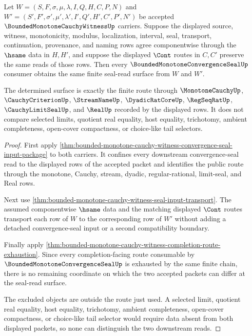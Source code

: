 \begin{theorem}
\label{thm:bounded-monotone-cauchy-witness-finite-seal-route-determinacy}
Let $W=(S,F,\sigma,\mu,\lambda,I,Q,H,C,P,N)$ and $W'=(S',F',\sigma',\mu',\lambda',I',Q',H',C',P',N')$ be accepted $\BoundedMonotoneCauchyWitnessUp$ carriers. Suppose the displayed source, witness, monotonicity, modulus, localization, interval, seal, transport, continuation, provenance, and naming rows agree componentwise through the $\hsame$ data in $H,H'$, and suppose the displayed $\Cont$ routes in $C,C'$ preserve the same reads of those rows. Then every $\BoundedMonotoneConvergenceSealUp$ consumer obtains the same finite seal-read surface from $W$ and $W'$.

The determined surface is exactly the finite route through $\MonotoneCauchyUp$, $\CauchyCriterionUp$, $\StreamNameUp$, $\DyadicRatCoreUp$, $\RegSeqRatUp$, $\CauchyLimitSealUp$, and $\RealUp$ recorded by the displayed rows. It does not compare selected limits, quotient real equality, host equality, trichotomy, ambient completeness, open-cover compactness, or choice-like tail selectors.
\end{theorem}
\begin{proof}
First apply \autoref{thm:bounded-monotone-cauchy-witness-convergence-seal-input-package} to both carriers. It confines every downstream convergence-seal read to the displayed rows of the accepted packet and identifies the public route through the monotone, Cauchy, stream, dyadic, regular-rational, limit-seal, and Real rows.

Next use \autoref{thm:bounded-monotone-cauchy-witness-seal-input-transport}. The assumed componentwise $\hsame$ data and the matching displayed $\Cont$ routes transport each row of $W$ to the corresponding row of $W'$ without adding a detached convergence-seal input or a second compatibility boundary.

Finally apply \autoref{thm:bounded-monotone-cauchy-witness-completion-route-exhaustion}. Since every completion-facing route consumable by $\BoundedMonotoneConvergenceSealUp$ is exhausted by the same finite chain, there is no remaining coordinate on which the two accepted packets can differ at the seal-read surface.

The excluded objects are outside the route just used. A selected limit, quotient real equality, host equality, trichotomy, ambient completeness, open-cover compactness, or choice-like tail selector would require data absent from both displayed packets, so none can distinguish the two downstream reads.
\end{proof}

